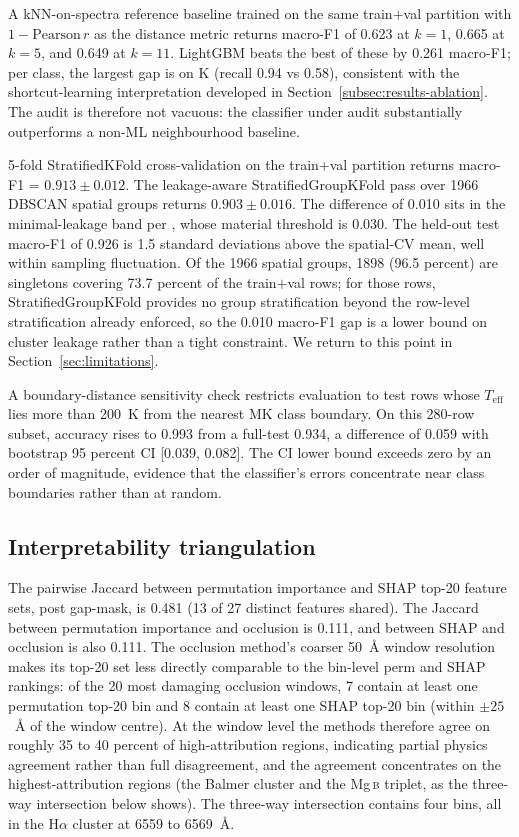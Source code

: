 \documentclass[11pt,a4paper]{article}
\newcommand{\Halpha}{H$\alpha$\xspace}
\newcommand{\Mgb}{Mg\,\textsc{b}\xspace}
\newcommand{\Teff}{$T_{\mathrm{eff}}$\xspace}
\begin{document}
A kNN-on-spectra reference baseline trained on the same train$+$val partition with $1 - \mathrm{Pearson}\,r$ as the distance metric returns macro-F1 of 0.623 at $k=1$, 0.665 at $k=5$, and 0.649 at $k=11$. LightGBM beats the best of these by 0.261 macro-F1; per class, the largest gap is on K (recall 0.94 vs 0.58), consistent with the shortcut-learning interpretation developed in Section~\ref{subsec:results-ablation}. The audit is therefore not vacuous: the classifier under audit substantially outperforms a non-ML neighbourhood baseline.

5-fold StratifiedKFold cross-validation on the train+val partition returns macro-F1 = $0.913 \pm 0.012$. The leakage-aware StratifiedGroupKFold pass over 1966 DBSCAN spatial groups returns $0.903 \pm 0.016$. The difference of 0.010 sits in the minimal-leakage band per \citet{2019MNRAS.486.2075B}, whose material threshold is 0.030. The held-out test macro-F1 of 0.926 is 1.5 standard deviations above the spatial-CV mean, well within sampling fluctuation. Of the 1966 spatial groups, 1898 (96.5 percent) are singletons covering 73.7 percent of the train$+$val rows; for those rows, StratifiedGroupKFold provides no group stratification beyond the row-level stratification already enforced, so the 0.010 macro-F1 gap is a lower bound on cluster leakage rather than a tight constraint. We return to this point in Section~\ref{sec:limitations}.

A boundary-distance sensitivity check restricts evaluation to test rows whose \Teff lies more than 200~K from the nearest MK class boundary. On this 280-row subset, accuracy rises to 0.993 from a full-test 0.934, a difference of 0.059 with bootstrap 95 percent CI [0.039, 0.082]. The CI lower bound exceeds zero by an order of magnitude, evidence that the classifier's errors concentrate near class boundaries rather than at random.

\subsection{Interpretability triangulation}

The pairwise Jaccard between permutation importance and SHAP top-20 feature sets, post gap-mask, is 0.481 (13 of 27 distinct features shared). The Jaccard between permutation importance and occlusion is 0.111, and between SHAP and occlusion is also 0.111. The occlusion method's coarser 50~\AA{} window resolution makes its top-20 set less directly comparable to the bin-level perm and SHAP rankings: of the 20 most damaging occlusion windows, 7 contain at least one permutation top-20 bin and 8 contain at least one SHAP top-20 bin (within $\pm 25$~\AA{} of the window centre). At the window level the methods therefore agree on roughly 35 to 40 percent of high-attribution regions, indicating partial physics agreement rather than full disagreement, and the agreement concentrates on the highest-attribution regions (the Balmer cluster and the \Mgb triplet, as the three-way intersection below shows). The three-way intersection contains four bins, all in the \Halpha cluster at 6559 to 6569~\AA{}.
\end{document}
